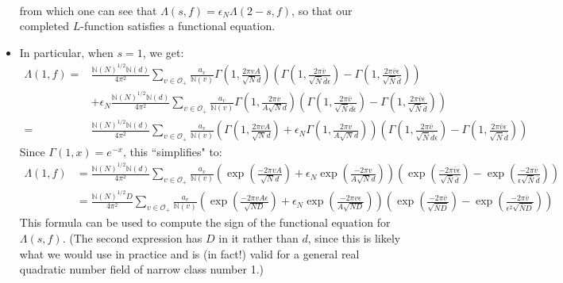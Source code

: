 \documentclass{article}
\theoremstyle{plain}
\begin{document}
\begin{itemize}
\begin{align}
\end{align}
from which one can see that $\Lambda(s,f)=\epsilon_N \Lambda(2-s,f)$, so that our completed $L$-function satisfies a functional equation.
\item In particular, when $s=1$, we get:
\begin{equation*}
\begin{split}
\Lambda(1,f)= & \frac{\mathbb{N}(N)^{1/2}\mathbb{N}(d)}{4\pi^2} \sum_{v \in \mathcal{O}_+} \frac{a_v}{\mathbb{N}(v)} \Gamma\left(1, \frac{2\pi v A}{\sqrt{N}d}\right) \left(\Gamma\left(1,\frac{2 \pi \bar{v}}{\sqrt{\bar{N}}\bar{d} \epsilon} \right)-  \Gamma\left(1,\frac{2 \pi \bar{v}\epsilon}{\sqrt{\bar{N}}\bar{d} } \right) \right) \\
&+  \epsilon_N \frac{\mathbb{N}(N)^{1/2}\mathbb{N}(d)}{4\pi^2} \sum_{v \in \mathcal{O}_+} \frac{a_v}{\mathbb{N}(v)} \Gamma\left(1, \frac{2\pi v }{A\sqrt{N}d}\right) \left(\Gamma\left(1,\frac{2 \pi \bar{v}}{\sqrt{\bar{N}}\bar{d} \epsilon} \right)-  \Gamma\left(1,\frac{2 \pi \bar{v}\epsilon}{\sqrt{\bar{N}}\bar{d} } \right) \right)\\
= &  \frac{\mathbb{N}(N)^{1/2}\mathbb{N}(d)}{4\pi^2} \sum_{v \in \mathcal{O}_+} \frac{a_v}{\mathbb{N}(v)} \left( \Gamma\left(1, \frac{2\pi v A}{\sqrt{N}d}\right) +\epsilon_N\Gamma\left(1, \frac{2\pi v }{A\sqrt{N}d}\right) \right)\left(\Gamma\left(1,\frac{2 \pi \bar{v}}{\sqrt{\bar{N}}\bar{d} \epsilon} \right)-  \Gamma\left(1,\frac{2 \pi \bar{v}\epsilon}{\sqrt{\bar{N}}\bar{d} } \right) \right)
\end{split}
\end{equation*}
Since $\Gamma(1,x)=e^{-x}$, this ``simplifies" to:
\begin{align*}
\Lambda(1,f) & = \frac{\mathbb{N}(N)^{1/2} \mathbb{N}(d)}{4\pi^2} \sum_{v \in \mathcal{O}_+} \frac{a_v}{\mathbb{N}(v)} \left( \exp\left(\frac{-2\pi vA}{\sqrt{N} d}\right) + \epsilon_N \exp\left(\frac{-2\pi v}{A\sqrt{N} d}\right) \right) \left( \exp \left(\frac{-2\pi \bar{v} \epsilon}{\sqrt{\bar{N}}\bar{d}}\right) -  \exp \left(\frac{-2\pi \bar{v}}{\epsilon\sqrt{\bar{N}}\bar{d}}\right)\right)\\
& = \frac{\mathbb{N}(N)^{1/2} D}{4\pi^2} \sum_{v \in \mathcal{O}_+} \frac{a_v}{\mathbb{N}(v)} \left( \exp\left(\frac{-2\pi vA\epsilon}{\sqrt{ND} }\right) + \epsilon_N \exp\left(\frac{-2\pi v\epsilon}{A\sqrt{ND}}\right) \right) \left( \exp \left(\frac{-2\pi \bar{v} }{\sqrt{\bar{N}D}}\right) -  \exp \left(\frac{-2\pi \bar{v}}{\epsilon^2\sqrt{\bar{N}D}}\right)\right)
\end{align*}
This formula can be used to compute the sign of the functional equation for $\Lambda(s,f)$. (The second expression has $D$ in it rather than $d$, since this is likely what we would use in practice and is (in fact!) valid for a general real quadratic number field of narrow class number 1.)


\end{itemize}
\end{document}
